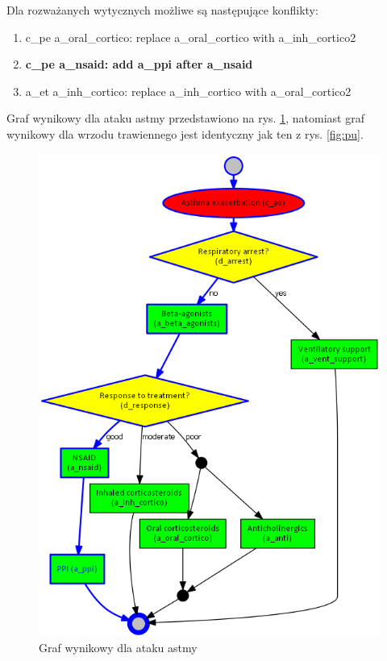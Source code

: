 Dla rozważanych wytycznych możliwe są następujące konflikty:
\begin{enumerate}
\item c\_pe a\_oral\_cortico: replace a\_oral\_cortico with a\_inh\_cortico2
\item \textbf{c\_pe a\_nsaid: add a\_ppi after a\_nsaid}
\item a\_et a\_inh\_cortico: replace a\_inh\_cortico with a\_oral\_cortico2
\end{enumerate}

Graf wynikowy dla ataku astmy przedstawiono na rys. \ref{fig:rozw_ae}, natomiast graf wynikowy dla wrzodu trawiennego jest identyczny jak ten z rys. \ref{fig:pu}.
\begin{figure}[H]
\centering
\includegraphics[scale=0.45]{img/rozwiazanie1asthma.png}
\caption{Graf wynikowy dla ataku astmy}
\label{fig:rozw_ae}
\end{figure}
\newpage
